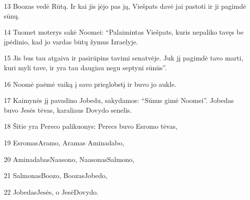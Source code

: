 \par 13 Boozas vedė Rūtą. Ir kai jis įėjo pas ją, Viešpats davė jai pastoti ir ji pagimdė sūnų. 
\par 14 Tuomet moterys sakė Noomei: “Palaimintas Viešpats, kuris nepaliko tavęs be įpėdinio, kad jo vardas būtų žymus Izraelyje. 
\par 15 Jis bus tau atgaiva ir pasirūpins tavimi senatvėje. Juk jį pagimdė tavo marti, kuri myli tave, ir yra tau daugiau negu septyni sūnūs”. 
\par 16 Noomė paėmė vaiką į savo prieglobstį ir buvo jo aukle. 
\par 17 Kaimynės jį pavadino Jobedu, sakydamos: “Sūnus gimė Noomei”. Jobedas buvo Jesės tėvas, karaliaus Dovydo senelis. 
\par 18 Šitie yra Pereco palikuonys: Perecs buvo Esromo tėvas, 
\par 19 Esromas­Aramo, Aramas­ Aminadabo, 
\par 20 Aminadabas­Naasono, Naasonas­Salmono, 
\par 21 Salmonas­Boozo, Boozas­Jobedo, 
\par 22 Jobedas­Jesės, o Jesė­Dovydo.



